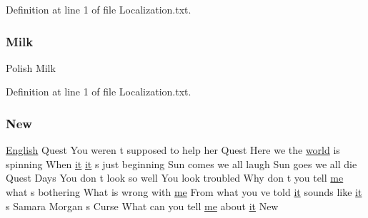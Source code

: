 Definition at line 1 of file Localization.\+txt.

\mbox{\label{_blooms_01_animal_01_husbandry_2_config_2_localization_8txt_ac290faa339c1d3831a1bea6d970ad974}} 
\subsubsection{\texorpdfstring{Milk}{Milk}}
{\footnotesize\ttfamily Polish Milk}



Definition at line 1 of file Localization.\+txt.

\mbox{\label{_blooms_01_animal_01_husbandry_2_config_2_localization_8txt_a8a16fa076ec2c405996c2039f397a8a6}} 
\subsubsection{\texorpdfstring{New}{New}}
{\footnotesize\ttfamily \mbox{\hyperlink{_sphere_i_i_01_winter_01_project_2_config_2_localization_8txt_ad896b63205779b1b09e86d941ce13976}{English}} Quest You weren t supposed to help her Quest Here we the \mbox{\hyperlink{_sphere_i_i_01_music_01_boxes_2_config_2_localization_8txt_a7ede01351426b1b7f6c1ce5f794e474f}{world}} is spinning When \mbox{\hyperlink{_the_01_restless_01_curse_2_config_2_localization_01-_01_quest_8txt_a741b285909bea4855b886664c2dcd50c}{it}} \mbox{\hyperlink{_the_01_restless_01_curse_2_config_2_localization_01-_01_quest_8txt_a741b285909bea4855b886664c2dcd50c}{it}} s just beginning Sun comes we all laugh Sun goes we all die Quest Days You don t look so well You look troubled Why don t you tell \mbox{\hyperlink{_blooms_01_animal_01_husbandry_2_config_2_localization_8txt_a290fbecf7c016b09bc675718400d6fca}{me}} what s bothering What is wrong with \mbox{\hyperlink{_blooms_01_animal_01_husbandry_2_config_2_localization_8txt_a290fbecf7c016b09bc675718400d6fca}{me}} From what you ve told \mbox{\hyperlink{_the_01_restless_01_curse_2_config_2_localization_01-_01_quest_8txt_a741b285909bea4855b886664c2dcd50c}{it}} sounds like \mbox{\hyperlink{_the_01_restless_01_curse_2_config_2_localization_01-_01_quest_8txt_a741b285909bea4855b886664c2dcd50c}{it}} s Samara Morgan s Curse What can you tell \mbox{\hyperlink{_blooms_01_animal_01_husbandry_2_config_2_localization_8txt_a290fbecf7c016b09bc675718400d6fca}{me}} about \mbox{\hyperlink{_the_01_restless_01_curse_2_config_2_localization_01-_01_quest_8txt_a741b285909bea4855b886664c2dcd50c}{it}} New}



